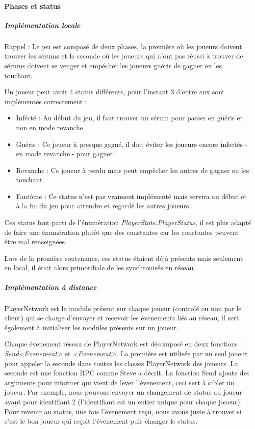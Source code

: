 \documentclass{article}
\begin{document}
\paragraph{Phases et status}

\subparagraph{Implémentation locale}

Rappel : Le jeu est composé de deux phases, la première où les joueurs doivent trouver les sérums et la seconde où les joueurs qui n'ont pas réussi à trouver de sérums doivent se venger et empécher les joueurs guéris de gagner en les touchant.

Un joueur peut avoir 4 status différents, pour l'instant 3 d'entre eux sont implémentés correctement :

\begin{itemize}
\item Infécté : Au début du jeu, il faut trouver un sérum pour passer en guéris et non en mode revanche
\item Guéris : Ce joueur à presque gagné, il doit éviter les joueurs encore infectés - en mode revanche - pour gagner
\item Revanche : Ce joueur à perdu mais peut empêcher les autres de gagner en les touchant
\item Fantôme : Ce status n'est pas vraiment implémenté mais servira au début et à la fin du jeu pour attendre et regardé les autres joueurs.
\end{itemize}

Ces status font parti de l'énumération \emph{PlayerState.PlayerStatus}, il est plus adapté de faire une énumération plutôt que des constantes car les constantes peuvent être mal renseignées.

Lors de la première soutenance, ces status étaient déjà présents mais seulement en local, il était alors primordiale de les synchronisés en réseau.

\subparagraph{Implémentation à distance}

PlayerNetwork est le module présent sur chaque joueur (controlé ou non par le client) qui se charge d'envoyer et recevoir les évenements liés au réseau, il sert également à initialiser les modules présents sur un joueur.

Chaque évenement réseau de PlayerNetwork est décomposé en deux fonctions : \emph{Send<Evenement>} et \emph{<Evenement>}. La première est utilisée par un seul joueur pour appeler la seconde dans toutes les classes PlayerNetwork des joueurs. La seconde est une fonction RPC comme Steve a décrit. La fonction Send ajoute des arguments pour informer qui vient de lever l'évenement, ceci sert à cibler un joueur. Par exemple, nous pouvons envoyer un changement de status au joueur ayant pour identifiant 2 (l'identifiant est un entier unique pour chaque joueur). Pour revenir au status, une fois l'évenement reçu, nous avons juste à trouver si c'est le bon joueur qui reçoit l'évenement puis changer le status.
\end{document}

